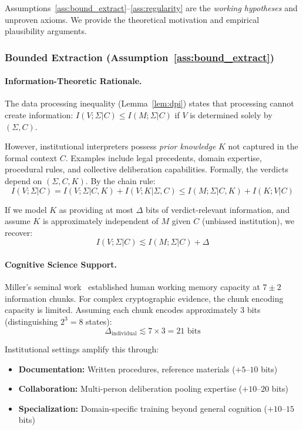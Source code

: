 \documentclass{ieeeaccess}
\begin{document}
Assumptions~\ref{ass:bound_extract}--\ref{ass:regularity} are the \emph{working hypotheses} and unproven axioms. We provide the theoretical motivation and empirical plausibility arguments.

\subsubsection{Bounded Extraction (Assumption~\ref{ass:bound_extract})}

\paragraph{Information-Theoretic Rationale.}
The data processing inequality (Lemma~\ref{lem:dpi}) states that processing cannot create information: $I(V;\Sigma|C) \leq I(M;\Sigma|C)$ if $V$ is determined solely by $(\Sigma, C)$.

However, institutional interpreters possess \emph{prior knowledge} $K$ not captured in the formal context $C$. Examples include legal precedents, domain expertise, procedural rules, and collective deliberation capabilities. Formally, the verdicts depend on $(\Sigma, C, K)$. By the chain rule:
\begin{equation}
I(V;\Sigma|C) = I(V;\Sigma|C,K) + I(V;K|\Sigma,C) \leq I(M;\Sigma|C,K) + I(K;V|C)
\end{equation}

If we model $K$ as providing at most $\Delta$ bits of verdict-relevant information, and assume $K$ is approximately independent of $M$ given $C$ (unbiased institution), we recover:
\begin{equation}
I(V;\Sigma|C) \lesssim I(M;\Sigma|C) + \Delta
\end{equation}

\paragraph{Cognitive Science Support.}
Miller's seminal work~\cite{Miller56} established human working memory capacity at $7 \pm 2$ information chunks. For complex cryptographic evidence, the chunk encoding capacity is limited. Assuming each chunk encodes approximately 3 bits (distinguishing $2^3 = 8$ states):
\begin{equation}
\Delta_{\text{individual}} \lesssim 7 \times 3 = 21 \text{ bits}
\end{equation}

Institutional settings amplify this through:
\begin{itemize}
\item \textbf{Documentation:} Written procedures, reference materials ($+5$--$10$ bits)
\item \textbf{Collaboration:} Multi-person deliberation pooling expertise ($+10$--$20$ bits)
\item \textbf{Specialization:} Domain-specific training beyond general cognition ($+10$--$15$ bits)
\end{itemize}
\end{document}
